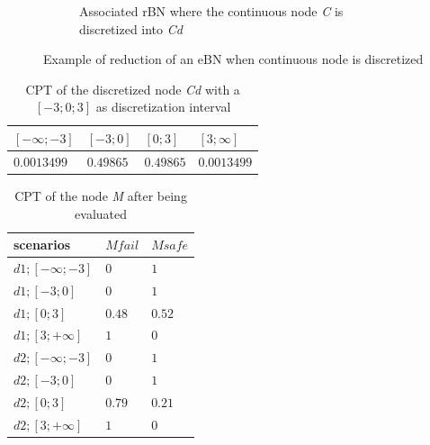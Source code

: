 \begin{figure}[h]
\begin{subfigure}{0.45\textwidth}
        \caption{Associated rBN where the continuous node \textit{C} is discretized into \textit{Cd}}\label{1_rbn_disc_example}
    \end{subfigure}
    \caption{Example of reduction of an eBN when continuous node is discretized}\label{1_reduction_disc}
\end{figure}

\begin{table}[hbt!]
    \begin{center}
        \caption{CPT of the discretized node \textit{Cd} with a $[-3;0;3]$ as discretization interval}\label{exact_disc_tab}
        \begin{tabular}{P{1.5cm}P{1.5cm}P{1.5cm}P{1.5cm}}
            \textbf{$[-\infty;-3]$} & \textbf{$[-3;0]$} & \textbf{$[0;3]$} & \textbf{$[3;\infty]$} \\
            \midrule
            $0.0013499$ & $ 0.49865$ & $ 0.49865$ & $0.0013499$ \\
        \end{tabular}
    \end{center}
\end{table}

\begin{table}[hbt!]
    \begin{center}
        \caption{CPT of the node \textit{M} after being evaluated}\label{Mnode_tab}
        \begin{tabular}{P{2cm}P{2cm}P{2cm}}
            \textbf{scenarios} & \textbf{$M fail$} & \textbf{$M safe$} \\
            \midrule
            $d1;[-\infty;-3]$ & $0$ & $1$ \\
            $d1;[-3;0]$ & $0$ & $1$ \\
            $d1;[0;3]$ & $ 0.48$ & $0.52$ \\
            $d1;[3;+\infty]$ & $ 1$ & $0$ \\
            $d2;[-\infty;-3]$ & $0$ & $1$ \\
            $d2;[-3;0]$ & $0$ & $1$ \\
            $d2;[0;3]$ & $0.79$ & $0.21$ \\
            $d2;[3;+\infty]$ & $1$ & $0$ \\
        \end{tabular}
    \end{center}
\end{table}


